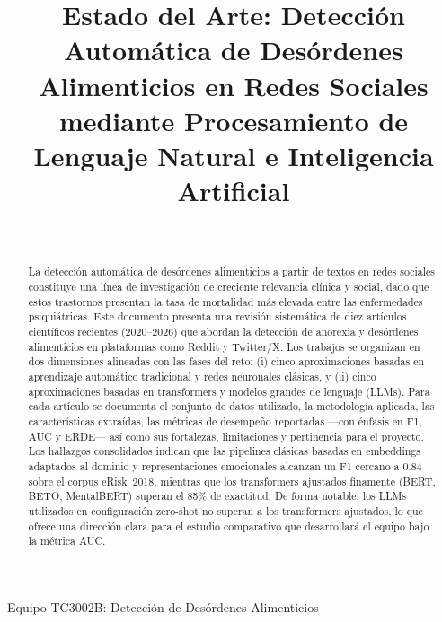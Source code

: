 \documentclass[journal]{IEEEtran}
\begin{document}
\title{Estado del Arte: Detección Automática de Desórdenes Alimenticios en Redes Sociales mediante Procesamiento de Lenguaje Natural e Inteligencia Artificial}

\author{
\\
}

%
{Equipo TC3002B: Detección de Desórdenes Alimenticios}

\maketitle

\begin{abstract}
La detección automática de desórdenes alimenticios a partir de textos en redes sociales constituye una línea de investigación de creciente relevancia clínica y social, dado que estos trastornos presentan la tasa de mortalidad más elevada entre las enfermedades psiquiátricas. Este documento presenta una revisión sistemática de diez artículos científicos recientes (2020--2026) que abordan la detección de anorexia y desórdenes alimenticios en plataformas como Reddit y Twitter/X. Los trabajos se organizan en dos dimensiones alineadas con las fases del reto: (i) cinco aproximaciones basadas en aprendizaje automático tradicional y redes neuronales clásicas, y (ii) cinco aproximaciones basadas en transformers y modelos grandes de lenguaje (LLMs). Para cada artículo se documenta el conjunto de datos utilizado, la metodología aplicada, las características extraídas, las métricas de desempeño reportadas ---con énfasis en F1, AUC y ERDE--- así como sus fortalezas, limitaciones y pertinencia para el proyecto. Los hallazgos consolidados indican que las pipelines clásicas basadas en embeddings adaptados al dominio y representaciones emocionales alcanzan un F1 cercano a 0.84 sobre el corpus eRisk~2018, mientras que los transformers ajustados finamente (BERT, BETO, MentalBERT) superan el 85\% de exactitud. De forma notable, los LLMs utilizados en configuración zero-shot no superan a los transformers ajustados, lo que ofrece una dirección clara para el estudio comparativo que desarrollará el equipo bajo la métrica AUC.
\end{abstract}
\end{document}
